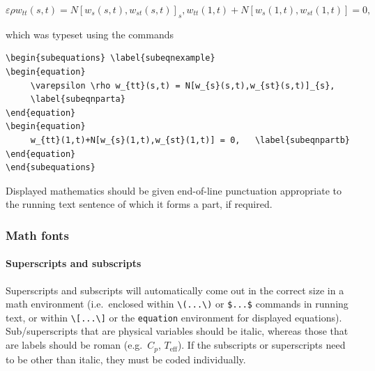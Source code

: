 \documentclass[]{interact}
\theoremstyle{plain}%
\theoremstyle{definition}
\theoremstyle{remark}
\begin{document}
\begin{subequations} \label{subeqnexample}
\begin{equation}
     \varepsilon \rho w_{tt}(s,t) = N[w_{s}(s,t),w_{st}(s,t)]_{s},
     \label{subeqnparta}
\end{equation}
\begin{equation}
     w_{tt}(1,t)+N[w_{s}(1,t),w_{st}(1,t)] = 0,
     \label{subeqnpartb}
\end{equation}
\end{subequations}

which was typeset using the commands

\begin{verbatim}
\begin{subequations} \label{subeqnexample}
\begin{equation}
     \varepsilon \rho w_{tt}(s,t) = N[w_{s}(s,t),w_{st}(s,t)]_{s},
     \label{subeqnparta}
\end{equation}
\begin{equation}
     w_{tt}(1,t)+N[w_{s}(1,t),w_{st}(1,t)] = 0,   \label{subeqnpartb}
\end{equation}
\end{subequations}
\end{verbatim}

Displayed mathematics should be given end-of-line punctuation appropriate to the running text sentence of which it forms a part, if required.

\hypertarget{math-fonts}{%
\subsubsection{Math fonts}\label{math-fonts}}

\hypertarget{superscripts-and-subscripts}{%
\paragraph{Superscripts and subscripts}\label{superscripts-and-subscripts}}

Superscripts and subscripts will automatically come out in the correct size in a math environment (i.e.~enclosed within \texttt{\textbackslash{}(...\textbackslash{})} or \texttt{\$...\$} commands in running text, or within \texttt{\textbackslash{}{[}...\textbackslash{}{]}} or the \texttt{equation} environment for displayed equations). Sub/superscripts that are physical variables should be italic, whereas those that are labels should be roman (e.g.~\(C_p\), \(T_\mathrm{eff}\)). If the subscripts or superscripts need to be other than italic, they must be coded individually.
\end{document}
